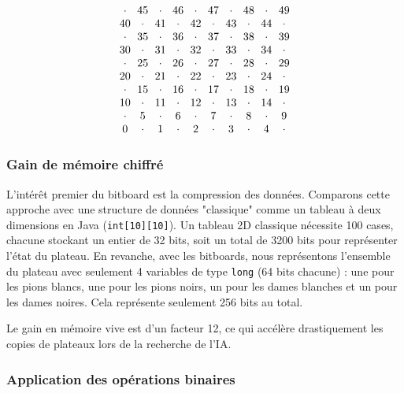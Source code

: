 \documentclass[a4paper]{article}
\begin{document}
\[
\setlength{\arraycolsep}{3pt}
\begin{array}{cccccccccc}
\cdot&45&\cdot&46&\cdot&47&\cdot&48&\cdot&49\\
40&\cdot&41&\cdot&42&\cdot&43&\cdot&44&\cdot\\
\cdot&35&\cdot&36&\cdot&37&\cdot&38&\cdot&39\\
30&\cdot&31&\cdot&32&\cdot&33&\cdot&34&\cdot\\
\cdot&25&\cdot&26&\cdot&27&\cdot&28&\cdot&29\\
20&\cdot&21&\cdot&22&\cdot&23&\cdot&24&\cdot\\
\cdot&15&\cdot&16&\cdot&17&\cdot&18&\cdot&19\\
10&\cdot&11&\cdot&12&\cdot&13&\cdot&14&\cdot\\
\cdot&5&\cdot&6&\cdot&7&\cdot&8&\cdot&9\\
0&\cdot&1&\cdot&2&\cdot&3&\cdot&4&\cdot
\end{array}
\]

\subsubsection{Gain de mémoire chiffré}

L'intérêt premier du bitboard est la compression des données. Comparons cette approche avec une structure de données "classique" comme un tableau à deux dimensions en Java (\texttt{int[10][10]}).
Un tableau 2D classique nécessite 100 cases, chacune stockant un entier de 32 bits, soit un total de 3200 bits pour représenter l'état du plateau. En revanche, avec les bitboards, 
nous représentons l'ensemble du plateau avec seulement 4 variables de type \texttt{long} (64 bits chacune) : une pour les pions blancs, une pour les pions noirs, 
un pour les dames blanches et un pour les dames noires. Cela représente seulement 256 bits au total.

Le gain en mémoire vive est d'un facteur 12, ce qui accélère drastiquement les copies de plateaux lors de la recherche de l'IA.

\subsubsection{Application des opérations binaires}
\end{document}
